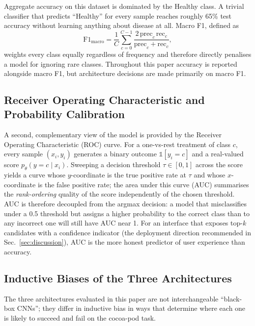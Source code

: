 \documentclass[conference,10pt]{IEEEtran}
\begin{document}
Aggregate accuracy on this dataset is dominated by the Healthy class. A
trivial classifier that predicts ``Healthy'' for every sample reaches roughly
65\% test accuracy without learning anything about disease at all. Macro F1,
defined as
\begin{equation}
\text{F1}_{\text{macro}}=\frac{1}{C}\sum_{c=0}^{C-1}
\frac{2\,\mathrm{prec}_c\,\mathrm{rec}_c}{\mathrm{prec}_c+\mathrm{rec}_c},
\end{equation}
weights every class equally regardless of frequency and therefore directly
penalises a model for ignoring rare classes. Throughout this paper accuracy
is reported alongside macro F1, but architecture decisions are made primarily
on macro F1.

\subsection{Receiver Operating Characteristic and Probability Calibration}

A second, complementary view of the model is provided by the Receiver
Operating Characteristic (ROC) curve. For a one-vs-rest treatment of class
$c$, every sample $(x_i,y_i)$ generates a binary outcome $\mathbb{1}[y_i=c]$
and a real-valued score $p_\theta(y=c\mid x_i)$. Sweeping a decision
threshold $\tau\in[0,1]$ across the score yields a curve whose
$y$-coordinate is the true positive rate at $\tau$ and whose $x$-coordinate
is the false positive rate; the area under this curve (AUC) summarises the
\emph{rank-ordering} quality of the score independently of the chosen
threshold. AUC is therefore decoupled from the argmax decision: a model
that misclassifies under a 0.5 threshold but assigns a higher probability
to the correct class than to any incorrect one will still have AUC near 1.
For an interface that exposes top-$k$ candidates with a confidence
indicator (the deployment direction recommended in
Sec.~\ref{sec:discussion}), AUC is the more honest predictor of user
experience than accuracy.

\subsection{Inductive Biases of the Three Architectures}\label{ssec:bias}

The three architectures evaluated in this paper are not interchangeable
``black-box CNNs''; they differ in inductive bias in ways that determine
where each one is likely to succeed and fail on the cocoa-pod task.
\end{document}
